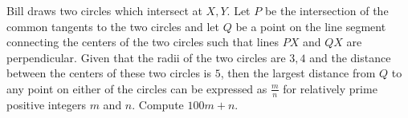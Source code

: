 Bill draws two circles which intersect at $X,Y$. Let $P$ be the intersection of the common tangents to the two circles and let $Q$ be a point on the line segment connecting the centers of the two circles such that lines $PX$ and $QX$ are perpendicular. Given that the radii of the two circles are $3,4$ and the distance between the centers of these two circles is $5$, then the largest distance from $Q$ to any point on either of the circles can be expressed as $\frac{m}{n}$ for relatively prime positive integers $m$ and $n$. Compute $100m+n$.
